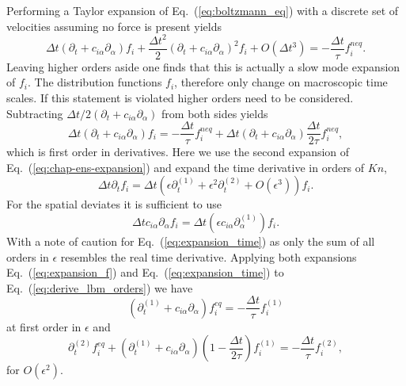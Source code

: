 Performing a Taylor expansion of Eq.~(\ref{eq:boltzmann_eq}) with a discrete set of velocities assuming no force is present yields~\cite{krugerLatticeBoltzmannMethod2017}
\begin{equation}\label{eq:Taylor_discret_boltzmann}
    \Delta t (\partial_t + c_{i\alpha}\partial_{\alpha})f_{i} + \frac{\Delta t^2}{2}(\partial_t + c_{i\alpha}\partial_{\alpha})^2 f_{i} + O(\Delta t^3) = -\frac{\Delta t}{\tau} f_{i}^{neq}.
\end{equation}
Leaving higher orders aside one finds that this is actually a slow mode expansion of $f_{i}$.
The distribution functions $f_{i}$, therefore only change on macroscopic time scales. 
If this statement is violated higher orders need to be considered.
Subtracting $\Delta t/2 (\partial_t + c_{i\alpha}\partial_{\alpha})$ from both sides yields
\begin{equation}\label{eq:derive_lbm_orders}
    \Delta t (\partial_t + c_{i\alpha}\partial_{\alpha})f_{i} = -\frac{\Delta t}{\tau} f_{i}^{neq} + \Delta t (\partial_t + c_{i\alpha}\partial_{\alpha})\frac{\Delta t}{2\tau} f^{neq}_{i},
\end{equation}
which is first order in derivatives.
Here we use the second expansion of Eq.~(\ref{eq:chap-ens-expansion}) and expand the time derivative in orders of $Kn$,
\begin{equation}\label{eq:expansion_time}
    \Delta t \partial_t f_{i} = \Delta t (\epsilon\partial_t^{(1)} + \epsilon^2\partial_t^{(2)} + O(\epsilon^3)) f_{i}.
\end{equation}
For the spatial deviates it is sufficient to use
\begin{equation}\label{eq:expansion_space}
    \Delta t c_{i\alpha}\partial_{\alpha} f_{i} = \Delta t(\epsilon c_{i\alpha}\partial_{\alpha}^{(1)}) f_{i}.
\end{equation}
With a note of caution for Eq.~(\ref{eq:expansion_time}) as only the sum of all orders in $\epsilon$ resembles the real time derivative.
Applying both expansions Eq.~(\ref{eq:expansion_f}) and Eq.~(\ref{eq:expansion_time}) to Eq.~(\ref{eq:derive_lbm_orders}) we have
\begin{equation}\label{eq:first_order_esp}
    (\partial_t^{(1)} + c_{i\alpha}\partial_{\alpha}) f_{i}^{eq} = -\frac{\Delta t}{\tau} f_{i}^{(1)}
\end{equation}
at first order in $\epsilon$ and 
\begin{equation}\label{eq:sec_order_esp}
    \partial_t^{(2)} f_{i}^{eq} + (\partial_t^{(1)} + c_{i\alpha}\partial_{\alpha})\left(1 - \frac{\Delta t}{2\tau}\right) f_{i}^{(1)} = -\frac{\Delta t}{\tau} f_{i}^{(2)},
\end{equation}
for $O(\epsilon^2)$.

